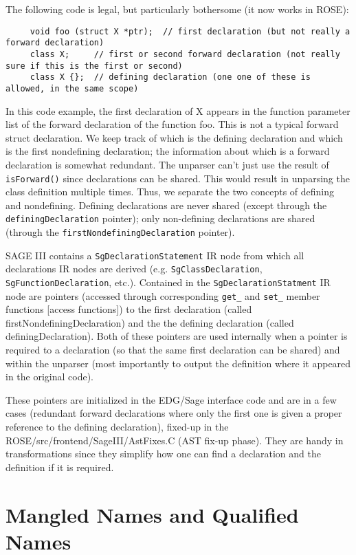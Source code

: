 The following code is legal, but particularly bothersome (it now works in ROSE):
{\indent
{\mySmallFontSize
\begin{verbatim}
     void foo (struct X *ptr);  // first declaration (but not really a forward declaration)
     class X;     // first or second forward declaration (not really sure if this is the first or second)
     class X {};  // defining declaration (one one of these is allowed, in the same scope)
\end{verbatim}
}}
   In this code example, the first declaration of X appears in the function parameter
list of the forward declaration of the function foo. This is not a typical forward 
struct declaration.  We keep track of which is the 
defining declaration and which is the first nondefining declaration; the information
about which is a forward declaration is somewhat redundant.  The unparser can't just 
use the result of {\tt isForward()} since declarations can be shared. This would
result in unparsing the class definition multiple times.  Thus, we separate
the two concepts of defining and nondefining. Defining declarations are never shared
(except through the {\tt definingDeclaration} pointer); only non-defining declarations
are shared (through the {\tt firstNondefiningDeclaration} pointer).

    SAGE III contains a {\tt SgDeclarationStatement} IR node from which all declarations IR nodes
are derived (e.g. {\tt SgClassDeclaration}, {\tt SgFunctionDeclaration}, etc.).  Contained in the
{\tt SgDeclarationStatment} IR node are pointers (accessed through corresponding {\tt get\_} and
{\tt set\_} member functions [access functions]) to the first declaration (called
firstNondefiningDeclaration) and the the defining declaration (called
definingDeclaration).  Both of these pointers are used internally when a pointer is
required to a declaration (so that the same first declaration can be shared)
and within the unparser (most importantly to output the definition where it
appeared in the original code).

   These pointers are initialized in the EDG/Sage interface code and are in a few cases
(redundant forward declarations where only the first one is given a proper reference to
the defining declaration), fixed-up in the ROSE/src/frontend/SageIII/AstFixes.C (AST fix-up
phase). They are handy in transformations since they simplify how one can find a
declaration and the definition if it is required.

\section{Mangled Names and Qualified Names}

